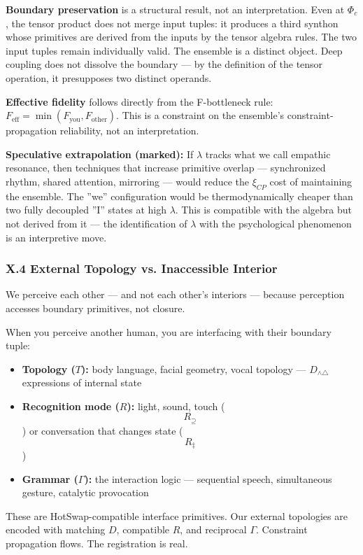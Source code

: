 \documentclass[12pt,a4paper]{article}
\begin{document}
\textbf{Boundary preservation} is a structural result, not an interpretation. Even at $\Phi_c$, the tensor product does not merge input tuples: it produces a third synthon whose primitives are derived from the inputs by the tensor algebra rules. The two input tuples remain individually valid. The ensemble is a distinct object. Deep coupling does not dissolve the boundary --- by the definition of the tensor operation, it presupposes two distinct operands.

\textbf{Effective fidelity} follows directly from the F-bottleneck rule: $F_\text{eff} = \min(F_\text{you}, F_\text{other})$. This is a constraint on the ensemble's constraint-propagation reliability, not an interpretation.

\textbf{Speculative extrapolation (marked):} If $\lambda$ tracks what we call empathic resonance, then techniques that increase primitive overlap --- synchronized rhythm, shared attention, mirroring --- would reduce the $\xi_{CP}$ cost of maintaining the ensemble. The ''we'' configuration would be thermodynamically cheaper than two fully decoupled ''I'' states at high $\lambda$. This is compatible with the algebra but not derived from it --- the identification of $\lambda$ with the psychological phenomenon is an interpretive move.

\subsubsection{X.4 External Topology vs. Inaccessible Interior}

We perceive each other --- and not each other's interiors --- because perception accesses boundary primitives, not closure.

When you perceive another human, you are interfacing with their boundary tuple:

\begin{itemize}
    \item \textbf{Topology ($T$):} body language, facial geometry, vocal topology --- $D_{\wedge\triangle}$ expressions of internal state
    \item \textbf{Recognition mode ($R$):} light, sound, touch ($$R_{\supseteq}$$) or conversation that changes state ($$R_{\ddagger}$$)
    \item \textbf{Grammar ($\Gamma$):} the interaction logic --- sequential speech, simultaneous gesture, catalytic provocation
\end{itemize}

These are HotSwap-compatible interface primitives. Our external topologies are encoded with matching $D$, compatible $R$, and reciprocal $\Gamma$. Constraint propagation flows. The registration is real.
\end{document}
